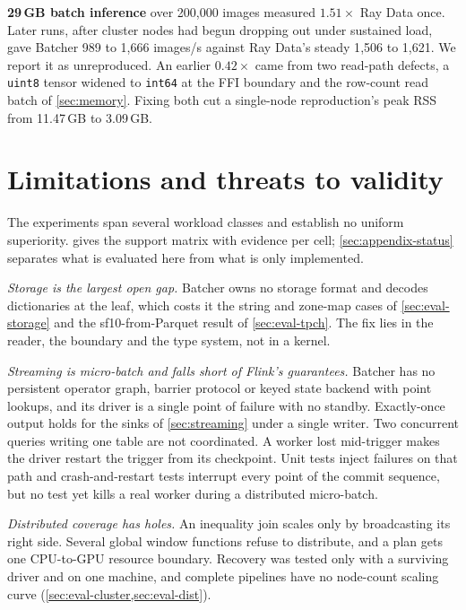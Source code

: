 \documentclass[10pt,twocolumn,letterpaper]{article}   %
\newcommand{\sys}{Batcher}
\begin{document}
\textbf{29\,GB batch inference} over 200{,}000 images measured $1.51\times$ Ray Data once. Later
runs, after cluster nodes had begun dropping out under sustained load, gave \sys{} 989 to
1{,}666 images/s against Ray Data's steady 1{,}506 to 1{,}621. We report it as unreproduced. An
earlier $0.42\times$ came from two read-path defects, a \texttt{uint8} tensor widened to
\texttt{int64} at the FFI boundary and the row-count read batch of \cref{sec:memory}. Fixing both
cut a single-node reproduction's peak RSS from 11.47\,GB to 3.09\,GB.

\section{Limitations and threats to validity}
\label{sec:limitations}

The experiments span several workload classes and establish no uniform superiority.
 gives the support matrix with evidence per cell; \cref{sec:appendix-status}
separates what is evaluated here from what is only implemented.

\emph{Storage is the largest open gap.} \sys{} owns no storage format and decodes dictionaries
at the leaf, which costs it the string and zone-map cases of \cref{sec:eval-storage} and the
sf10-from-Parquet result of \cref{sec:eval-tpch}. The fix lies in the reader, the boundary and
the type system, not in a kernel.

\emph{Streaming is micro-batch and falls short of Flink's guarantees.} \sys{} has no persistent
operator graph, barrier protocol or keyed state backend with point lookups, and its driver is a
single point of failure with no standby. Exactly-once output holds for the sinks of
\cref{sec:streaming} under a single writer. Two concurrent queries writing one table are not
coordinated. A worker lost mid-trigger makes the driver restart the trigger from its checkpoint.
Unit tests inject failures on that path and crash-and-restart tests interrupt every point of the
commit sequence, but no test yet kills a real worker during a distributed micro-batch.

\emph{Distributed coverage has holes.} An inequality join scales only by broadcasting its right
side. Several global window functions refuse to distribute, and a plan gets one CPU-to-GPU
resource boundary. Recovery was tested only with a surviving driver and on one machine, and complete
pipelines have no node-count scaling curve (\cref{sec:eval-cluster,sec:eval-dist}).
\end{document}
